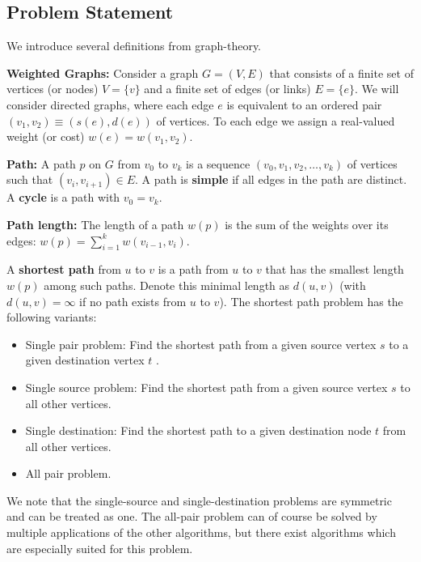 \subsection{Problem Statement}
We introduce several definitions from graph-theory.
\begin{definition}\textbf{Weighted Graphs:} Consider a graph $G = (V,E)$ that consists of a finite set of vertices (or nodes) $V = \{ v\} $ and a finite set of edges (or links) $E = \{ e\} $. We will consider directed graphs, where each edge $e$ is equivalent to an ordered pair $({v_1},{v_2}) \equiv (s(e),d(e))$ of vertices. To each edge we assign a real-valued weight (or cost) $w(e) = w({v_1},{v_2})$.
\end{definition}
\begin{definition}\textbf{Path:}
A path $p$ on $G$ from ${v_0}$ to ${v_k}$ is a sequence $({v_0},{v_1},{v_2}, \ldots ,{v_k})$ of vertices such that $({v_i},{v_{i + 1}}) \in E$. A path is \textbf{simple} if all edges in the path are distinct.
A \textbf{cycle}  is a path with ${v_0} = {v_k}$.
\end{definition}
\begin{definition}\textbf{Path length:}
The length of a path $w(p)$ is the sum of the weights over its edges:
$w(p) = \sum\limits_{i = 1}^k {w({v_{i - 1}},{v_i})} $.
\end{definition}

A \textbf{shortest path} from $u$ to $v$ is a path from $u$ to $v$ that has the smallest length  $w(p)$ among such paths. Denote this minimal length as $d(u,v)$ (with $d(u,v) = \infty $ if no path exists from $u$ to $v$).
The shortest path problem has the following variants:
\begin{itemize}
  \item Single pair problem:  Find the shortest path from a given source vertex $s$ to a given destination vertex $t$ .
  \item Single source problem: Find the shortest path from a given source vertex $s$ to all other vertices.
  \item Single destination: Find the shortest path to a given destination node $t$ from all other vertices.
  \item All pair problem.
\end{itemize}

We note that the single-source and single-destination problems are symmetric and can be treated as one.  The all-pair problem can of course be solved by multiple applications of the other algorithms, but there exist algorithms which are especially suited for this problem.

